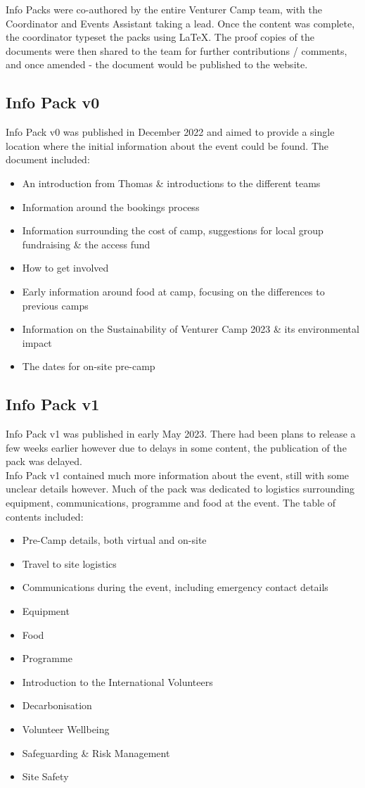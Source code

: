 Info Packs were co-authored by the entire Venturer Camp team, with the Coordinator and Events Assistant taking a lead. Once the content was complete, the coordinator typeset the packs using \LaTeX. The proof copies of the documents were then shared to the team for further contributions / comments, and once amended - the document would be published to the website. 

\subsection{Info Pack v0}
Info Pack v0 was published in December 2022 and aimed to provide a single location where the initial information about the event could be found. The document included:
\begin{itemize}
    \item An introduction from Thomas \& introductions to the different teams
    \item Information around the bookings process
    \item Information surrounding the cost of camp, suggestions for local group fundraising \& the access fund
    \item How to get involved
    \item Early information around food at camp, focusing on the differences to previous camps
    \item Information on the Sustainability of Venturer Camp 2023 \& its environmental impact
    \item The dates for on-site pre-camp
\end{itemize}

\subsection{Info Pack v1}
Info Pack v1 was published in early May 2023. There had been plans to release a few weeks earlier however due to delays in some content, the publication of the pack was delayed. \\

Info Pack v1 contained much more information about the event, still with some unclear details however. Much of the pack was dedicated to logistics surrounding equipment, communications, programme and food at the event. The table of contents included:
\begin{itemize}
    \item Pre-Camp details, both virtual and on-site
    \item Travel to site logistics
    \item Communications during the event, including emergency contact details
    \item Equipment
    \item Food
    \item Programme
    \item Introduction to the International Volunteers
    \item Decarbonisation
    \item Volunteer Wellbeing
    \item Safeguarding \& Risk Management
    \item Site Safety
\end{itemize}

